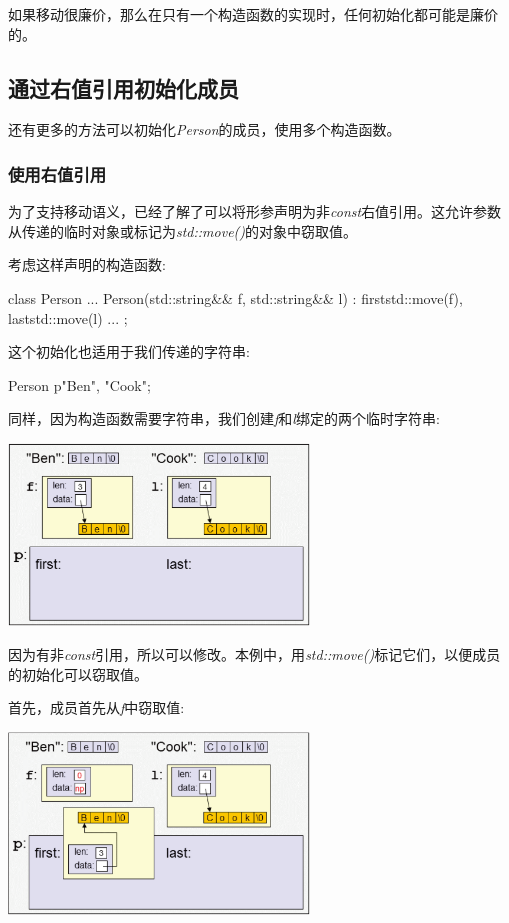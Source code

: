 如果移动很廉价，那么在只有一个构造函数的实现时，任何初始化都可能是廉价的。

\subsection{通过右值引用初始化成员}

还有更多的方法可以初始化\textit{Person}的成员，使用多个构造函数。

\subsubsection{使用右值引用}

为了支持移动语义，已经了解了可以将形参声明为非\textit{const}右值引用。这允许参数从传递的临时对象或标记为\textit{std::move()}的对象中窃取值。

考虑这样声明的构造函数:

\begin{cppcode}
class Person {
	...
	Person(std::string&& f, std::string&& l)
	: first{std::move(f)}, last{std::move(l)} {
	}
	...
};
\end{cppcode}

这个初始化也适用于我们传递的字符串:

\begin{cppcode}
Person p{"Ben", "Cook"};
\end{cppcode}

同样，因为构造函数需要字符串，我们创建\textit{f}和\textit{l}绑定的两个临时字符串:

\begin{center}
	\includegraphics[width=0.6\textwidth]{part1/ch4/images/8}
\end{center}

因为有非\textit{const}引用，所以可以修改。本例中，用\textit{std::move()}标记它们，以便成员的初始化可以窃取值。

首先，成员首先从\textit{f}中窃取值:

\begin{center}
	\includegraphics[width=0.6\textwidth]{part1/ch4/images/9}
\end{center}


